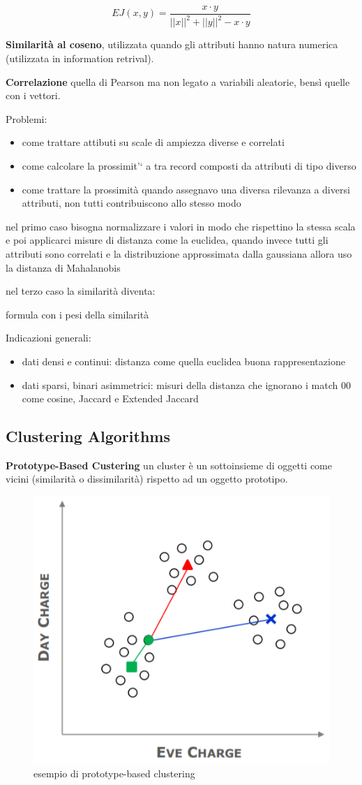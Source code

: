 \[ EJ(x,y) = \frac{x \cdot y}{||x||^2 + ||y||^2 - x \cdot y}\]


\textbf{Similarit\`a al coseno}, utilizzata quando gli attributi hanno natura numerica (utilizzata in information retrival).

\textbf{Correlazione} quella di Pearson ma non legato a variabili aleatorie, bensì quelle con i vettori. 

Problemi:
\begin{itemize}
	\item come trattare attibuti su scale di ampiezza diverse e correlati
	\item come calcolare la prossimit'` a tra record composti da attributi di tipo diverso
	\item come trattare la prossimit\`a quando assegnavo una diversa rilevanza a diversi attributi, non tutti contribuiscono allo stesso modo
\end{itemize}

nel primo caso bisogna normalizzare i valori in modo che rispettino la stessa scala e poi applicarci misure di distanza come la euclidea, quando invece tutti gli attributi sono correlati e la distribuzione approssimata dalla gaussiana allora uso la distanza di Mahalanobis

nel terzo caso la similarit\`a diventa:

formula con i pesi della similarit\`a 

Indicazioni generali:

\begin{itemize}
	\item dati densi e continui: distanza come quella euclidea buona rappresentazione
	\item dati sparsi, binari asimmetrici: misuri della distanza che ignorano i match 00 come cosine, Jaccard e Extended Jaccard
\end{itemize}

\subsection{Clustering Algorithms}

\textbf{Prototype-Based Custering} un cluster \`e un sottoinsieme di oggetti come vicini (similarit\`a o dissimilarit\`a) rispetto ad un oggetto prototipo. 

\begin{figure}[h!]
	\centering
	\includegraphics[height=0.4 \linewidth]{clustering/pict/prototype_cluster.png}
	\caption{esempio di prototype-based clustering}
\end{figure}


